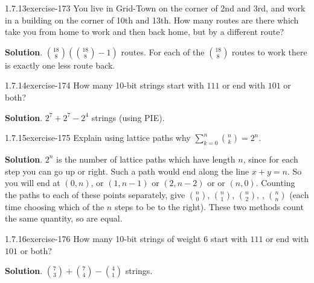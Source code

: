 \documentclass[twoside,11pt,]{book}
\numberwithin{equation}{chapter}
\begin{document}
\begin{divisionsolution}{1.7.13}{}{exercise-173}%
\hypertarget{p-2828}{}%
You live in Grid-Town on the corner of 2nd and 3rd, and work in a building on the corner of 10th and 13th. How many routes are there which take you from home to work and then back home, but by a different route?%
\par\smallskip%
\noindent\textbf{Solution}.\quad%
\hypertarget{p-2830}{}%
\({18 \choose 8}\left({18 \choose 8} - 1\right)\) routes. For each of the \(\binom{18}{8}\) routes to work there is exactly one less route back.%
\end{divisionsolution}%
\begin{divisionsolution}{1.7.14}{}{exercise-174}%
\hypertarget{p-2834}{}%
How many 10-bit strings start with \(111\) or end with \(101\) or both?%
\par\smallskip%
\noindent\textbf{Solution}.\quad%
\hypertarget{p-2836}{}%
\(2^7 + 2^7 - 2^4\) strings (using PIE).%
\end{divisionsolution}%
\begin{divisionsolution}{1.7.15}{}{exercise-175}%
\hypertarget{p-2837}{}%
Explain using lattice paths why \(\sum_{k=0}^n {n \choose k} = 2^n\).%
\par\smallskip%
\noindent\textbf{Solution}.\quad%
\hypertarget{p-2838}{}%
\(2^n\) is the number of lattice paths which have length \(n\), since for each step you can go up or right. Such a path would end along the line \(x + y = n\). So you will end at \((0,n)\), or \((1,n-1)\) or \((2, n-2)\) or \textellipsis{} or \((n,0)\). Counting the paths to each of these points separately, give \({n \choose 0}\), \({n \choose 1}\), \({n \choose 2}\), \textellipsis{}, \({n \choose n}\) (each time choosing which of the \(n\) steps to be to the right). These two methods count the same quantity, so are equal.%
\end{divisionsolution}%
\begin{divisionsolution}{1.7.16}{}{exercise-176}%
\hypertarget{p-2842}{}%
How many 10-bit strings of weight 6 start with \(111\) or end with \(101\) or both?%
\par\smallskip%
\noindent\textbf{Solution}.\quad%
\hypertarget{p-2844}{}%
\({7 \choose 3} + {7 \choose 4} - {4 \choose 1}\) strings.%
\end{divisionsolution}%
\end{document}
